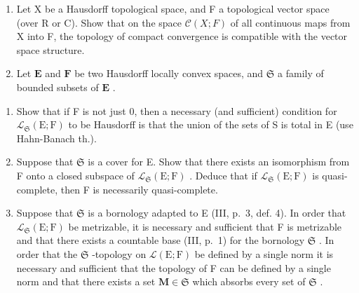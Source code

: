 \exercisegroup

\begin{enumerate}
\def\labelenumi{\arabic{enumi})}
\item
  Let X be a Hausdorff topological space, and F a topological vector space (over R or C). Show that on the space \(\mathcal{C}(X; F)\) of all continuous maps from X into F, the topology of compact convergence is compatible with the vector space structure.
\item
  Let \(\mathbf{E}\) and \(\mathbf{F}\) be two Hausdorff locally convex spaces, and \(\mathfrak{S}\) a family of bounded subsets of \(\mathbf{E}\) .
\end{enumerate}

\begin{enumerate}
\def\labelenumi{\alph{enumi})}
\item
  Show that if F is not just 0, then a necessary (and sufficient) condition for \(\mathcal{L}_{\mathfrak{S}}(\mathrm{E};\mathrm{F})\) to be Hausdorff is that the union of the sets of S is total in E (use Hahn-Banach th.).
\item
  Suppose that \(\mathfrak{S}\) is a cover for E. Show that there exists an isomorphism from F onto a closed subspace of \(\mathcal{L}_{\mathfrak{S}}(\mathrm{E};\mathrm{F})\) . Deduce that if \(\mathcal{L}_{\mathfrak{S}}(\mathrm{E};\mathrm{F})\) is quasi-complete, then F is necessarily quasi-complete.
\item
  Suppose that \(\mathfrak{S}\) is a bornology adapted to E (III, p.~3, def. 4). In order that \(\mathcal{L}_{\mathfrak{S}}(\mathrm{E};\mathrm{F})\) be metrizable, it is necessary and sufficient that F is metrizable and that there exists a countable base (III, p.~1) for the bornology \(\mathfrak{S}\) . In order that the \(\mathfrak{S}\) -topology on \(\mathcal{L}(\mathrm{E};\mathrm{F})\) be defined by a single norm it is necessary and sufficient that the topology of F can be defined by a single norm and that there exists a set \(\mathbf{M} \in \mathfrak{S}\) which absorbs every set of \(\mathfrak{S}\) .
\end{enumerate}

